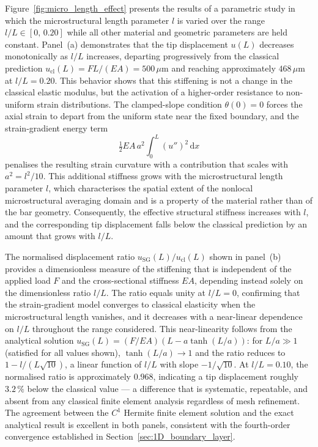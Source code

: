 \documentclass[final,3p,times,fleqn]{elsarticle}
\begin{document}
Figure~\ref{fig:micro_length_effect} presents the results of a
parametric study in which the microstructural length parameter $l$ is
varied over the range $l/L \in [0,\,0.20]$ while all other material
and geometric parameters are held constant.
Panel~(a) demonstrates that the tip displacement $u(L)$ decreases
monotonically as $l/L$ increases, departing progressively from the
classical prediction $u_{\mathrm{cl}}(L) = FL/(EA) = 500\,\mu\mathrm{m}$
and reaching approximately $468\,\mu\mathrm{m}$ at $l/L = 0.20$.
This behavior shows that this stiffening is not a change in the classical
elastic modulus, but the activation of a higher-order resistance to
non-uniform strain distributions.
The clamped-slope condition $\theta(0) = 0$ forces the axial strain to
depart from the uniform state near the fixed boundary, and the
strain-gradient energy term
%
\begin{equation*}
  \tfrac{1}{2}EA\,a^{2}\int_{0}^{L}(u'')^{2}\,\mathrm{d}x
\end{equation*}
%
penalises the resulting strain curvature with a contribution that
scales with $a^{2} = l^{2}/10$.
This additional stiffness grows with the microstructural length
parameter $l$, which characterises the spatial extent of the nonlocal
microstructural averaging domain and is a property of the material
rather than of the bar geometry.
Consequently, the effective structural stiffness increases with $l$,
and the corresponding tip displacement falls below the classical
prediction by an amount that grows with $l/L$.

The normalised displacement ratio
$u_{\mathrm{SG}}(L)/u_{\mathrm{cl}}(L)$ shown in panel~(b) provides a
dimensionless measure of the stiffening that is independent of the
applied load $F$ and the cross-sectional stiffness $EA$, depending
instead solely on the dimensionless ratio $l/L$.
The ratio equals unity at $l/L = 0$, confirming that the
strain-gradient model converges to classical elasticity when the
microstructural length vanishes, and it decreases with a near-linear
dependence on $l/L$ throughout the range considered.
This near-linearity follows from the analytical solution
$u_{\mathrm{SG}}(L) = (F/EA)(L - a\tanh(L/a))$: for $L/a \gg 1$
(satisfied for all values shown), $\tanh(L/a) \to 1$ and the ratio
reduces to $1 - l/(L\sqrt{10})$, a linear function of $l/L$ with
slope $-1/\sqrt{10}$.
At $l/L = 0.10$, the normalised ratio is approximately $0.968$,
indicating a tip displacement roughly $3.2\,\%$ below the classical
value --- a difference that is systematic, repeatable, and absent from
any classical finite element analysis regardless of mesh refinement.
The agreement between the $C^{1}$ Hermite finite element solution and
the exact analytical result is excellent in both panels, consistent
with the fourth-order convergence established in
Section~\ref{sec:1D_boundary_layer}.
\end{document}

